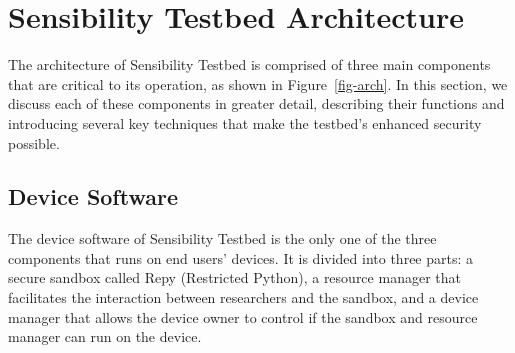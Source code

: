 \section{Sensibility Testbed Architecture}\label{sec-design}

The architecture of Sensibility Testbed is comprised of three main components that are critical 
to its operation, as shown in Figure~\ref{fig-arch}. In this section, we discuss each of these components in 
greater detail, describing their functions and introducing several key 
techniques that make the testbed's enhanced security possible. 

\subsection{Device Software}\label{sec-repy}

The device software of Sensibility Testbed is the only one of the three 
components that runs on end users' devices. It is divided into three 
parts: a secure sandbox called Repy (Restricted Python), a resource 
manager that facilitates the interaction between researchers and the 
sandbox, and a device manager that allows the device owner to control 
if the sandbox and resource manager can run on the device.


